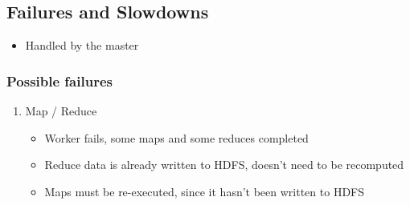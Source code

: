 \documentclass[11pt]{article}
\begin{document}
\subsection{Failures and Slowdowns}
\label{sec:orgheadline3}
\begin{itemize}
\item Handled by the master
\end{itemize}
\subsubsection{Possible failures}
\label{sec:orgheadline2}
\begin{enumerate}
\item Map / Reduce
\begin{itemize}
\item Worker fails, some maps and some reduces completed
\item Reduce data is already written to HDFS, doesn't need to be recomputed
\item Maps must be re-executed, since it hasn't been written to HDFS
\end{itemize}
\end{enumerate}
\end{document}
